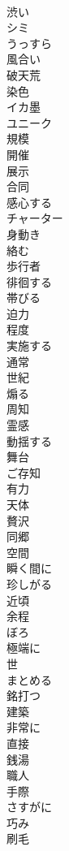 \documentclass[8pt]{extreport}
\begin{document}
\begin{CJK}{UTF8}{min}
\\	渋い
\\	シミ
\\	うっすら
\\	風合い
\\	破天荒
\\	染色
\\	イカ墨
\\	ユニーク
\\	規模
\\	開催
\\	展示
\\	合同
\\	感心する
\\	チャーター
\\	身動き
\\	絡む
\\	歩行者
\\	徘徊する
\\	帯びる
\\	迫力
\\	程度
\\	実施する
\\	通常
\\	世紀
\\	煽る
\\	周知
\\	霊感
\\	動揺する
\\	舞台
\\	ご存知
\\	有力
\\	天体
\\	贅沢
\\	同郷
\\	空間
\\	瞬く間に
\\	珍しがる
\\	近頃
\\	余程
\\	ぼろ
\\	極端に
\\	世
\\	まとめる
\\	銘打つ
\\	建築
\\	非常に
\\	直接
\\	銭湯
\\	職人
\\	手際
\\	さすがに
\\	巧み
\\	刷毛

\end{CJK}
\end{document}
